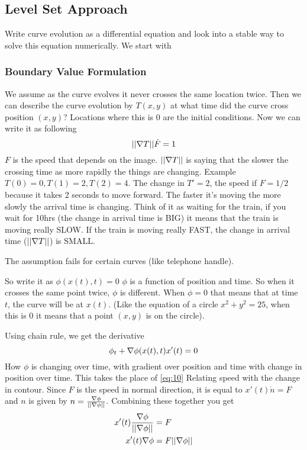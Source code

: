 \subsection{Level Set Approach}
\label{sec:level-set-approach}
Write curve evolution as a differential equation and look into a
stable way to solve this equation numerically. 
We start with
\subsubsection{Boundary Value Formulation}
We assume as the curve evolves it never crosses the same location
twice. Then we can describe the curve evolution by $T(x,y)$ at what
time did the curve cross position $(x,y)$? Locations where this is 0
are the initial conditions. Now we can write it as following
\begin{equation}
  \label{eq:10}
||\nabla T || \dot F = 1
\end{equation}
$F$ is the speed that depends on the image. $||\nabla T||$ is
saying that the slower the crossing time as more rapidly the things
are changing. 
Example $T(0) = 0, T(1) = 2, T(2)=4$. The change in $T' = 2$, the
speed if $F=1/2$ because it takes 2 seconds to move forward. The
faster it's moving the more slowly the arrival time is changing. Think
of it as waiting for the train, if you wait for 10hrs (the change in
arrival time is BIG) it means that
the train is moving really SLOW. If the train is moving really FAST,
the change in arrival time ($||\nabla T||$) is SMALL.

The assumption fails for certain curves (like telephone handle).

So write it as $\phi(x(t), t)=0$ $\phi$ is a function of position and
time. So when it crosses the same point twice, $\phi$ is different. When $\phi=0$ that means that at time $t$, the curve will be at
$x(t)$. (Like the equation of a circle $x^2+y^2=25$, when this is 0 it
means that a point $(x,y)$ is on the circle).

Using chain rule, we get the derivative
\begin{equation}
  \label{eq:15}
  \phi_t + \nabla \phi(x(t),t)x'(t) = 0
\end{equation}
How $\phi$ is changing over time, with gradient over position and time
with change in position over time. This takes the place of \eqref{eq:10}
Relating speed with the change in contour. Since $F$ is the speed in normal
direction, it is equal to $x'(t) \dot n = F$  and $n$ is given by $n=\frac{\nabla \phi}{||\nabla
  \phi||}$. 
Combining these together you get 
\begin{align*}
 x'(t)\frac{\nabla \phi}{||\nabla \phi ||} &= F\\
  x'(t) \nabla \phi&= F||\nabla \phi ||\\
\end{align*}

